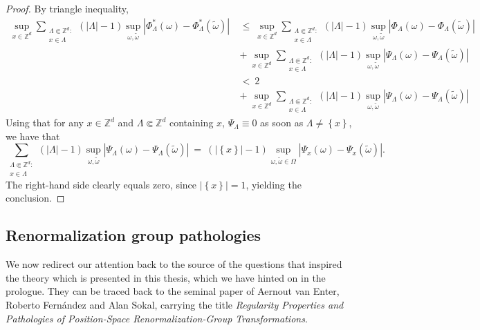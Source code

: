 \documentclass[12pt]{article}
\newcommand{\Z}{\mathbb{Z}}
\newcommand{\set}[1]{\left\{#1\right\}}
\newcommand{\1}{\mathbbm{1}}
\newcommand{\5}{\vspace{0.5cm}}
\renewcommand{\tilde}{\widetilde}
\theoremstyle{definition}
\begin{document}
\begin{proof}
By triangle inequality,
\begin{align*}
\sup_{x\in\Z^d}\sum_{\substack{\Lambda\Subset\Z^d:\\x\in\Lambda}}(|\Lambda|-1)\sup_{\omega,\tilde{\omega}}|\Phi_\Lambda^*(\omega)-\Phi_\Lambda^*(\tilde{\omega})| ~&\leq~ \sup_{x\in\Z^d}\sum_{\substack{\Lambda\Subset\Z^d:\\x\in\Lambda}}(|\Lambda|-1)\sup_{\omega,\tilde{\omega}}|\Phi_\Lambda(\omega)-\Phi_\Lambda(\tilde{\omega})| \\
&+~ \sup_{x\in\Z^d}\sum_{\substack{\Lambda\Subset\Z^d:\\x\in\Lambda}}(|\Lambda|-1)\sup_{\omega,\tilde{\omega}}|\Psi_\Lambda(\omega)-\Psi_\Lambda(\tilde{\omega})| \\
&<~ 2 \\
&+~ \sup_{x\in\Z^d}\sum_{\substack{\Lambda\Subset\Z^d:\\x\in\Lambda}}(|\Lambda|-1)\sup_{\omega,\tilde{\omega}}|\Psi_\Lambda(\omega)-\Psi_\Lambda(\tilde{\omega})|
\end{align*}
Using that for any $x\in\Z^d$ and $\Lambda\Subset\Z^d$ containing $x$, $\Psi_\Lambda\equiv 0$ as soon as $\Lambda\neq\set{x}$, we have that
$$\sum_{\substack{\Lambda\Subset\Z^d:\\x\in\Lambda}}(|\Lambda|-1)\sup_{\omega,\tilde{\omega}}|\Psi_\Lambda(\omega)-\Psi_\Lambda(\tilde{\omega})| ~=~ (|\!\set{x}\!|-1)\sup_{\omega,\tilde{\omega}\in\Omega}|\Psi_x(\omega)-\Psi_x(\tilde{\omega})|.$$
The right-hand side clearly equals zero, since $|\!\set{x}\!|=1$, yielding the conclusion.
\end{proof} 


\subsection{Renormalization group pathologies}

We now redirect our attention back to the source of the questions that inspired the theory which is presented in this thesis, which we have hinted on in the prologue. They can be traced back to the seminal paper of Aernout van Enter, Roberto Fern\'andez and Alan Sokal, carrying the title \textit{Regularity Properties and Pathologies of Position-Space Renormalization-Group Transformations}. \\
\end{document}
